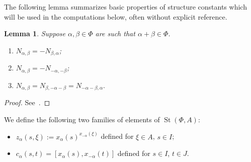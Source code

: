 \documentclass[oneside, 8pt]{amsart}
\newtheorem{lemma}{Lemma}
\theoremstyle{remark}
\theoremstyle{definition}
\DeclareMathOperator{\St}{St}
\numberwithin{equation}{section}
\begin{document}
The following lemma summarizes basic properties of structure constants which will be used in the computations below, often without explicit reference.
\begin{lemma} Suppose $\alpha, \beta \in \Phi$ are such that $\alpha+\beta \in \Phi$.
\begin{enumerate}\label{lem:structure-constants}
 \item $N_{\alpha, \beta} = -N_{\beta,\alpha}$;
 \item $N_{\alpha, \beta} = - N_{-\alpha, -\beta}$;
 \item $N_{\alpha, \beta} = N_{\beta, -\alpha-\beta} = N_{-\alpha-\beta, \alpha}.$
\end{enumerate}
\end{lemma}
\begin{proof} See~\cite[\S~14]{VP}. \end{proof}

We define the following two families of elements of $\St(\Phi, A)$:
\begin{itemize}
 \item $z_\alpha(s, \xi) := x_\alpha(s)^{x_{-\alpha}(\xi)}$ defined for $\xi \in A$, $s \in I$;
 \item $c_\alpha(s, t) = [x_\alpha(s), x_{-\alpha}(t)]$ defined for $s \in I$, $t \in J$.
\end{itemize}
\end{document}
